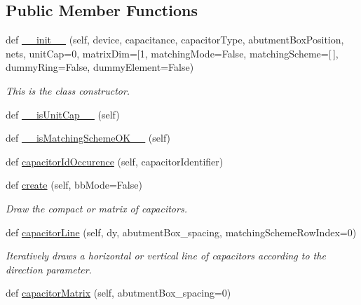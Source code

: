 \subsection*{Public Member Functions}
\begin{DoxyCompactItemize}
\item 
def \mbox{\hyperlink{classpython_1_1capacitormatrix_1_1CapacitorStack_a7e9bfbe8f722de7d3472f6971e235328}{\+\_\+\+\_\+init\+\_\+\+\_\+}} (self, device, capacitance, capacitor\+Type, abutment\+Box\+Position, nets, unit\+Cap=0, matrix\+Dim=\mbox{[}1, matching\+Mode=False, matching\+Scheme=\mbox{[}$\,$\mbox{]}, dummy\+Ring=False, dummy\+Element=False)
\begin{DoxyCompactList}\small\item\em This is the class constructor. \end{DoxyCompactList}\item 
def \mbox{\hyperlink{classpython_1_1capacitormatrix_1_1CapacitorStack_ababc3906986a38853f947e52f870a50c}{\+\_\+\+\_\+is\+Unit\+Cap\+\_\+\+\_\+}} (self)
\item 
def \mbox{\hyperlink{classpython_1_1capacitormatrix_1_1CapacitorStack_ada775cb99286f2386facfe173b74f8c6}{\+\_\+\+\_\+is\+Matching\+Scheme\+O\+K\+\_\+\+\_\+}} (self)
\item 
def \mbox{\hyperlink{classpython_1_1capacitormatrix_1_1CapacitorStack_a3a76b3e916ad8bfec0513765c297f4ed}{capacitor\+Id\+Occurence}} (self, capacitor\+Identifier)
\item 
def \mbox{\hyperlink{classpython_1_1capacitormatrix_1_1CapacitorStack_a142799d140cb1936225cf8e224af2b8d}{create}} (self, bb\+Mode=False)
\begin{DoxyCompactList}\small\item\em Draw the compact or matrix of capacitors. \end{DoxyCompactList}\item 
def \mbox{\hyperlink{classpython_1_1capacitormatrix_1_1CapacitorStack_a67f014dfa18e1ef67be992df3e731923}{capacitor\+Line}} (self, dy, abutment\+Box\+\_\+spacing, matching\+Scheme\+Row\+Index=0)
\begin{DoxyCompactList}\small\item\em Iteratively draws a horizontal or vertical line of capacitors according to the {\ttfamily direction} parameter. \end{DoxyCompactList}\item 
def \mbox{\hyperlink{classpython_1_1capacitormatrix_1_1CapacitorStack_af325c6856f657efc6819db6c1ed87fa0}{capacitor\+Matrix}} (self, abutment\+Box\+\_\+spacing=0)

\end{DoxyCompactItemize}
